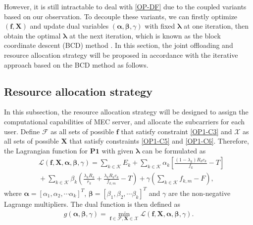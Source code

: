 \documentclass[journal]{IEEEtran}
\begin{document}
However, it is still intractable to deal with \eqref{OP-DF} due to the coupled variants based on our observation. To decouple these variants, we can firstly optimize $(\boldsymbol{f}, \boldsymbol{X})$ and update dual variables $(\boldsymbol\alpha,\boldsymbol\beta,\gamma)$ with fixed $\boldsymbol{\lambda}$ at one iteration, then obtain the optimal $\boldsymbol\lambda$ at the next iteration, which is known as the block coordinate descent (BCD) method \cite{Richt2014Iteration}. In this section, the joint offloading and resource allocation strategy will be proposed in accordance with the iterative approach based on the BCD method as follows.
\subsection{Resource allocation strategy}\label{3A}
In this subsection, the resource allocation strategy will be designed to assign the computational capabilities of MEC server, and allocate the subcarriers for each user. Define $\mathcal{F}$ as all sets of possible $\boldsymbol{f}$ that satisfy constraint \eqref{OP1-C3} and $\mathcal{X}$ as all sets of possible $\boldsymbol{X}$ that satisfy constraints \eqref{OP1-C5} and \eqref{OP1-C6}. Therefore, the Lagrangian function for $\mathbf{P1}$ with given $\boldsymbol\lambda$ can be formulated as 
\begin{equation}\label{OP-L}
\begin{aligned}
&\!\mathcal{L}(\boldsymbol{f},\boldsymbol{X},\boldsymbol\alpha,\boldsymbol\beta,\gamma)\!=\!\!\sum_{k\in\mathcal{K}} \!E_k\!+\!\!\sum_{k\in\mathcal{K}}\alpha_{k}\!\left[\frac{(1\!-\!\lambda_{k})R_{k}c_{k}}{f_{k}}\!-\!T\right]\\
&\!\!+\!\sum_{k\in\mathcal{K}}\!\beta_{k}\!\left(\frac{\lambda_{k}R_{k}}{r_{k}}\!+\!\frac{\lambda_{k}R_{k}c_{k}}{f_{k,m}}\!-\!T\right)\!\!+\!\gamma\!\left(\sum_{k\in\mathcal{K}}f_{k,m}\!-\!F\right)\!,
\end{aligned}    
\end{equation}
where $\boldsymbol\alpha = \left[\alpha_{1},\alpha_{2},\cdots\alpha_{k}\right]^T$, $\boldsymbol\beta = \left[\beta_{1},\beta_{2},\cdots\beta_{k}\right]^T$ and $\gamma$ are the non-negative Lagrange multipliers. The dual function is then defined as
\begin{equation}\label{OP-DF}
\begin{aligned}
g(\boldsymbol\alpha,\boldsymbol \beta,\gamma) = \min_{\boldsymbol{f}\in\mathcal{F},\boldsymbol{X}\in \mathcal{X}}\mathcal{L}(\boldsymbol{f},\boldsymbol{X},\boldsymbol\alpha,\boldsymbol\beta,\gamma).
\end{aligned}    
\end{equation}
\end{document}
